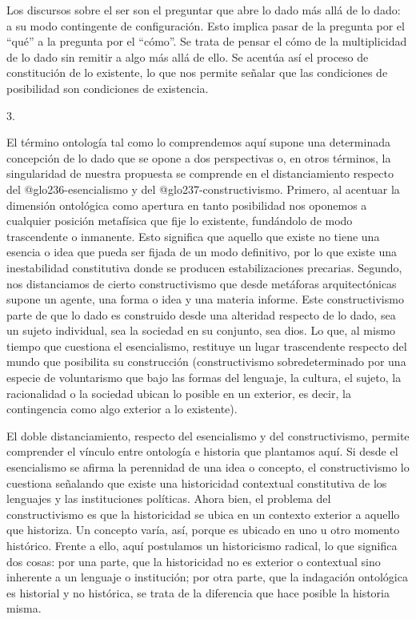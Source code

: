 Los discursos sobre el ser son el preguntar que abre lo dado más allá de lo dado: a su modo contingente de configuración. Esto implica pasar de la pregunta por el \enquote{qué} a la pregunta por el \enquote{cómo}. Se trata de pensar el cómo de la multiplicidad de lo dado sin remitir a algo más allá de ello. Se acentúa así el proceso de constitución de lo existente, lo que nos permite señalar que las condiciones de posibilidad son condiciones de existencia.

3.

El término ontología tal como lo comprendemos aquí supone una determinada concepción de lo dado que se opone a dos perspectivas o, en otros términos, la singularidad de nuestra propuesta se comprende en el distanciamiento respecto del \gls{@glo236-esencialismo} y del \gls{@glo237-constructivismo}. Primero, al acentuar la dimensión ontológica como apertura en tanto posibilidad nos oponemos a cualquier posición metafísica que fije lo existente, fundándolo de modo trascendente o inmanente. Esto significa que aquello que existe no tiene una esencia o idea que pueda ser fijada de un modo definitivo, por lo que existe una inestabilidad constitutiva donde se producen estabilizaciones precarias. Segundo, nos distanciamos de cierto constructivismo que desde metáforas arquitectónicas supone un agente, una forma o idea y una materia informe. Este constructivismo parte de que lo dado es construido desde una alteridad respecto de lo dado, sea un sujeto individual, sea la sociedad en su conjunto, sea dios. Lo que, al mismo tiempo que cuestiona el esencialismo, restituye un lugar trascendente respecto del mundo que posibilita su construcción (constructivismo sobredeterminado por una especie de voluntarismo que bajo las formas del lenguaje, la cultura, el sujeto, la racionalidad o la sociedad ubican lo posible en un exterior, es decir, la contingencia como algo exterior a lo existente).

El doble distanciamiento, respecto del esencialismo y del constructivismo, permite comprender el vínculo entre ontología e historia que plantamos aquí. Si desde el esencialismo se afirma la perennidad de una idea o concepto, el constructivismo lo cuestiona señalando que existe una historicidad contextual constitutiva de los lenguajes y las instituciones políticas. Ahora bien, el problema del constructivismo es que la historicidad se ubica en un contexto exterior a aquello que historiza. Un concepto varía, así, porque es ubicado en uno u otro momento histórico. Frente a ello, aquí postulamos un historicismo radical, lo que significa dos cosas: por una parte, que la historicidad no es exterior o contextual sino inherente a un lenguaje o institución; por otra parte, que la indagación ontológica es historial y no histórica, se trata de la diferencia que hace posible la historia misma.

